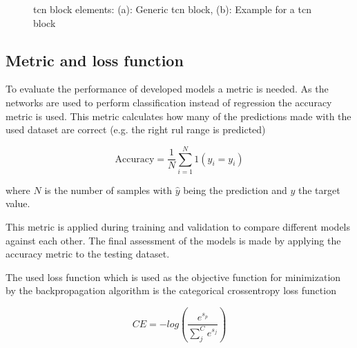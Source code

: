 \documentclass[conference]{IEEEtran}
\begin{document}
\begin{figure}[htp]
	\centering
	\quad
	\caption{\gls{tcn} block elements: (a): Generic \gls{tcn} block, (b): Example for a \gls{tcn} block \cite{Bai2018}}
	\label{fig:tcn_block}
\end{figure}

\subsection{Metric and loss function}
\label{sec:metric_and_loss_function}

To evaluate the performance of developed models a metric is needed. As the networks are used to perform classification instead of regression the accuracy metric is used. This metric calculates how many of the predictions made with the used dataset are correct (e.g. the right \gls{rul} range is predicted)

\begin{equation}
	\label{eq:accuracy_metric}
	\mathrm{Accuracy} = \frac{1}{N} \sum_{i=1}^{N} 1 (\hat{y}_i = y_i)
\end{equation}

where $ N $ is the number of samples with $ \hat{y} $ being the prediction and $ y $ the target value.

This metric is applied during training and validation to compare different models against each other. The final assessment of the models is made by applying the accuracy metric to the testing dataset.

The used loss function which is used as the objective function for minimization by the backpropagation algorithm is the categorical crossentropy loss function

\begin{equation}
	\label{eq:categorical-cross-entrophy}
	CE = -log(\frac{e^{s_p}}{\sum_{j}^{C} e^{s_j}})	
\end{equation}
\end{document}
